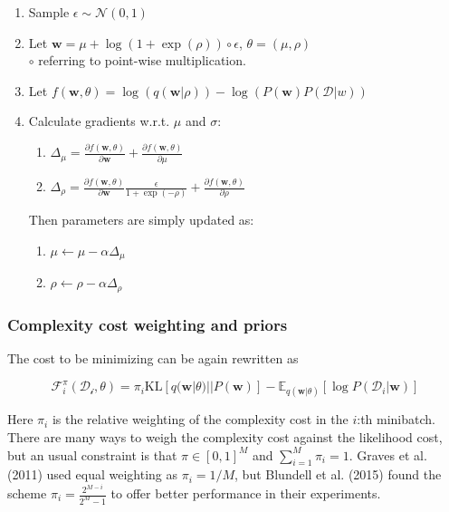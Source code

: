 	\begin{enumerate}
		\item Sample $\epsilon \sim \mathcal{N}(0,1)$
		\item Let  $ \pmb{w} = \mu + \log(1 + \exp(\rho)) \circ  \epsilon$, $\theta = (\mu, \rho)$ \\ $\circ$ referring to point-wise multiplication.
		\item Let $f(\pmb{w}, \theta) = \log(q(\pmb{w}|\rho)) - \log(P(\pmb{w})P(\mathcal{D}|w))$
		\item Calculate gradients w.r.t. $\mu$ and $\sigma$:
		\begin{enumerate}
			\item $\Delta_\mu  = \frac{\partial f(\pmb{w},\theta)}{\partial \pmb{w}} + 
			\frac{\partial f(\pmb{w},\theta)}{\partial \mu}$ 
			
			\item $\Delta_\rho  = \frac{\partial f(\pmb{w},\theta)}{\partial \pmb{w}}\frac{\epsilon}{1 + \exp(-\rho)} +
			\frac{\partial f(\pmb{w},\theta)}{\partial \rho}$
		\end{enumerate}
		Then parameters are simply updated as:
		\begin{enumerate}
			\item $\mu \leftarrow \mu - \alpha \Delta_\mu$
			\item $\rho \leftarrow \rho - \alpha \Delta_\rho$ 
		\end{enumerate}
	\end{enumerate}
	
	
	
	\subsubsection*{Complexity cost weighting and priors}
	
	The cost to be minimizing can be again rewritten as 
	
	\begin{equation}
		\mathcal{F}^\pi_i(\mathcal{D_i}, \theta) = \pi_i \text{KL}[q(\pmb{w}|\theta) || P(\pmb{w})] - \mathbb{E}_{q(\pmb{w}|\theta)}[\log P(\mathcal{D}_i|\pmb{w})]
	\end{equation}
	
	Here $\pi_i$ is the relative weighting of the complexity cost in the $i$:th minibatch. 
	There are many ways to weigh the complexity cost against the likelihood cost, but an usual constraint is that $\pi \in [0,1]^M$ and $\sum_{i=1}^{M} \pi_i = 1$. Graves et al. (2011) \cite{graves_practical_2011} used equal weighting as $\pi_i = 1/M$, but Blundell et al. (2015) \cite{blundell_weight_2015} found the scheme $\pi_i =\frac{2^{M-i}}{2^M - 1}$ to offer better performance in their experiments. 

